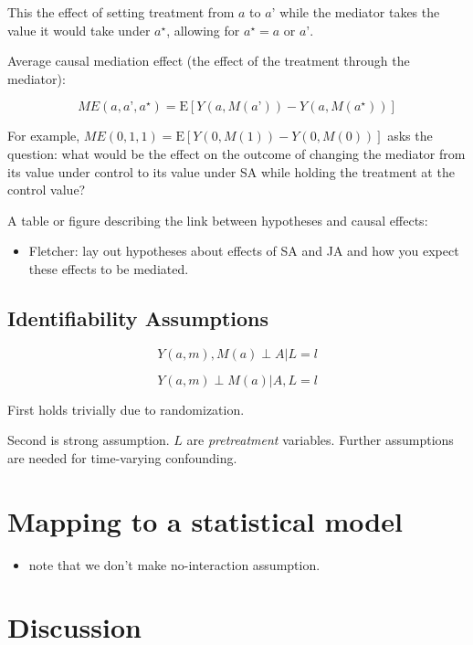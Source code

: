 \documentclass[]{article}
\providecommand{\tightlist}{%
  \setlength{\itemsep}{0pt}\setlength{\parskip}{0pt}}
\begin{document}
This the effect of setting treatment from \(a\) to \(a’\) while the
mediator takes the value it would take under \(a^{\star}\), allowing for
\(a^{\star} = a\) or \(a’\).

Average causal mediation effect (the effect of the treatment through the
mediator):

\[
ME(a, a’, a^{\star}) = \mathrm{E}[Y(a, M(a’)) - Y(a, M(a^{\star}))]
\]

For example, \(ME(0, 1, 1) = \mathrm{E}[Y(0, M(1)) - Y(0, M(0))]\) asks
the question: what would be the effect on the outcome of changing the
mediator from its value under control to its value under SA while
holding the treatment at the control value?

A table or figure describing the link between hypotheses and causal
effects:

\begin{itemize}
\tightlist
\item
  Fletcher: lay out hypotheses about effects of SA and JA and how you
  expect these effects to be mediated.
\end{itemize}

\hypertarget{identifiability-assumptions}{%
\subsection{Identifiability
Assumptions}\label{identifiability-assumptions}}

\[
Y(a, m), M(a) \perp A | L = l
\]

\[
Y(a, m) \perp M(a) | A, L = l
\]

First holds trivially due to randomization.

Second is strong assumption. \(L\) are \emph{pretreatment} variables.
Further assumptions are needed for time-varying confounding.

\hypertarget{mapping-to-a-statistical-model}{%
\section{Mapping to a statistical
model}\label{mapping-to-a-statistical-model}}

\begin{itemize}
\tightlist
\item
  note that we don't make no-interaction assumption.
\end{itemize}

\hypertarget{discussion}{%
\section{Discussion}\label{discussion}}
\end{document}
